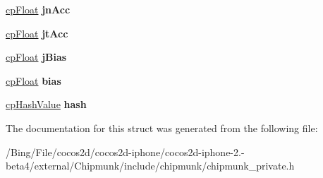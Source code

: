 \begin{DoxyCompactItemize}
\item 
\hypertarget{structcp_contact_ab6e608723226293fed10834a1e79215c}{\hyperlink{group__basic_types_gac1ed65573e035bf892505768c852d8d3}{cp\-Float} {\bfseries jn\-Acc}}\label{structcp_contact_ab6e608723226293fed10834a1e79215c}

\item 
\hypertarget{structcp_contact_a45337f7a21dc55faf402f87465d7bd5c}{\hyperlink{group__basic_types_gac1ed65573e035bf892505768c852d8d3}{cp\-Float} {\bfseries jt\-Acc}}\label{structcp_contact_a45337f7a21dc55faf402f87465d7bd5c}

\item 
\hypertarget{structcp_contact_a0a626c4ba591d693e88eceb737b22d80}{\hyperlink{group__basic_types_gac1ed65573e035bf892505768c852d8d3}{cp\-Float} {\bfseries j\-Bias}}\label{structcp_contact_a0a626c4ba591d693e88eceb737b22d80}

\item 
\hypertarget{structcp_contact_ae7f4f699739f54df581effb936ffe766}{\hyperlink{group__basic_types_gac1ed65573e035bf892505768c852d8d3}{cp\-Float} {\bfseries bias}}\label{structcp_contact_ae7f4f699739f54df581effb936ffe766}

\item 
\hypertarget{structcp_contact_a1ecf53c870da47cdedfb9340b774ee08}{\hyperlink{group__basic_types_gae7eb4775a9f43914a15553ca65a048f4}{cp\-Hash\-Value} {\bfseries hash}}\label{structcp_contact_a1ecf53c870da47cdedfb9340b774ee08}

\end{DoxyCompactItemize}


The documentation for this struct was generated from the following file\-:\begin{DoxyCompactItemize}
\item 
/\-Bing/\-File/cocos2d/cocos2d-\/iphone/cocos2d-\/iphone-\/2.-\/beta4/external/\-Chipmunk/include/chipmunk/chipmunk\-\_\-private.\-h\end{DoxyCompactItemize}
